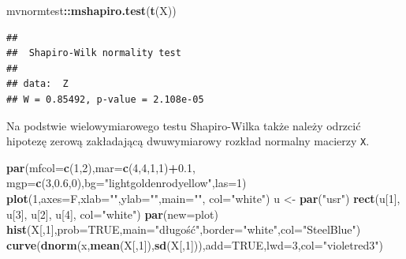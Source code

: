\documentclass[polish,]{book}
\newenvironment{Shaded}{\begin{snugshade}}{\end{snugshade}}
\newcommand{\DataTypeTok}[1]{\textcolor[rgb]{0.13,0.29,0.53}{#1}}
\newcommand{\DecValTok}[1]{\textcolor[rgb]{0.00,0.00,0.81}{#1}}
\newcommand{\FloatTok}[1]{\textcolor[rgb]{0.00,0.00,0.81}{#1}}
\newcommand{\KeywordTok}[1]{\textcolor[rgb]{0.13,0.29,0.53}{\textbf{#1}}}
\newcommand{\NormalTok}[1]{#1}
\newcommand{\OperatorTok}[1]{\textcolor[rgb]{0.81,0.36,0.00}{\textbf{#1}}}
\newcommand{\OtherTok}[1]{\textcolor[rgb]{0.56,0.35,0.01}{#1}}
\newcommand{\StringTok}[1]{\textcolor[rgb]{0.31,0.60,0.02}{#1}}
\begin{document}
\begin{Shaded}
\begin{Highlighting}[]
\NormalTok{mvnormtest}\OperatorTok{::}\KeywordTok{mshapiro.test}\NormalTok{(}\KeywordTok{t}\NormalTok{(X))}
\end{Highlighting}
\end{Shaded}

\begin{verbatim}
## 
##  Shapiro-Wilk normality test
## 
## data:  Z
## W = 0.85492, p-value = 2.108e-05
\end{verbatim}

Na podstwie wielowymiarowego testu Shapiro-Wilka także należy odrzcić hipotezę
zerową zakładającą dwuwymiarowy rozkład normalny macierzy \texttt{X}.

\begin{Shaded}
\begin{Highlighting}[]
\KeywordTok{par}\NormalTok{(}\DataTypeTok{mfcol=}\KeywordTok{c}\NormalTok{(}\DecValTok{1}\NormalTok{,}\DecValTok{2}\NormalTok{),}\DataTypeTok{mar=}\KeywordTok{c}\NormalTok{(}\DecValTok{4}\NormalTok{,}\DecValTok{4}\NormalTok{,}\DecValTok{1}\NormalTok{,}\DecValTok{1}\NormalTok{)}\OperatorTok{+}\FloatTok{0.1}\NormalTok{, }\DataTypeTok{mgp=}\KeywordTok{c}\NormalTok{(}\DecValTok{3}\NormalTok{,}\FloatTok{0.6}\NormalTok{,}\DecValTok{0}\NormalTok{),}\DataTypeTok{bg=}\StringTok{"lightgoldenrodyellow"}\NormalTok{,}\DataTypeTok{las=}\DecValTok{1}\NormalTok{)}
\KeywordTok{plot}\NormalTok{(}\DecValTok{1}\NormalTok{,}\DataTypeTok{axes=}\NormalTok{F,}\DataTypeTok{xlab=}\StringTok{""}\NormalTok{,}\DataTypeTok{ylab=}\StringTok{""}\NormalTok{,}\DataTypeTok{main=}\StringTok{""}\NormalTok{, }\DataTypeTok{col=}\StringTok{"white"}\NormalTok{)}
\NormalTok{u <-}\StringTok{ }\KeywordTok{par}\NormalTok{(}\StringTok{"usr"}\NormalTok{)}
\KeywordTok{rect}\NormalTok{(u[}\DecValTok{1}\NormalTok{], u[}\DecValTok{3}\NormalTok{], u[}\DecValTok{2}\NormalTok{], u[}\DecValTok{4}\NormalTok{], }\DataTypeTok{col=}\StringTok{"white"}\NormalTok{)}
\KeywordTok{par}\NormalTok{(}\DataTypeTok{new=}\NormalTok{plot)}
\KeywordTok{hist}\NormalTok{(X[,}\DecValTok{1}\NormalTok{],}\DataTypeTok{prob=}\OtherTok{TRUE}\NormalTok{,}\DataTypeTok{main=}\StringTok{"długość"}\NormalTok{,}\DataTypeTok{border=}\StringTok{"white"}\NormalTok{,}\DataTypeTok{col=}\StringTok{"SteelBlue"}\NormalTok{)}
\KeywordTok{curve}\NormalTok{(}\KeywordTok{dnorm}\NormalTok{(x,}\KeywordTok{mean}\NormalTok{(X[,}\DecValTok{1}\NormalTok{]),}\KeywordTok{sd}\NormalTok{(X[,}\DecValTok{1}\NormalTok{])),}\DataTypeTok{add=}\OtherTok{TRUE}\NormalTok{,}\DataTypeTok{lwd=}\DecValTok{3}\NormalTok{,}\DataTypeTok{col=}\StringTok{"violetred3"}\NormalTok{)}

\end{Highlighting}
\end{Shaded}
\end{document}
